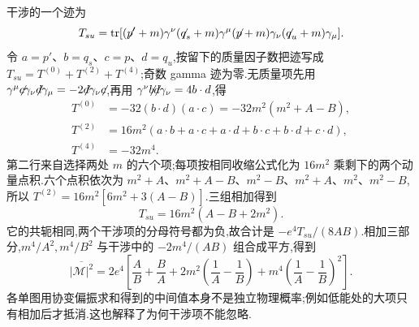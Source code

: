 干涉的一个迹为
\begin{equation}
 T_{su}=\tr[(\slashed p'+m)\gamma^\nu(\slashed q_s+m)\gamma^\mu
 (\slashed p+m)\gamma_\nu(\slashed q_u+m)\gamma_\mu].
\end{equation}
令 $a=p'$、$b=q_s$、$c=p$、$d=q_u$,按留下的质量因子数把迹写成 $T_{su}=T^{(0)}+T^{(2)}+T^{(4)}$;奇数 gamma 迹为零.无质量项先用
$\gamma^\mu\slashed c\gamma_\nu\slashed d\gamma_\mu=-2\slashed d\gamma_\nu\slashed c$,再用 $\gamma^\nu\slashed b\slashed d\gamma_\nu=4b\cdot d$,得
\begin{align}
 T^{(0)}&=-32(b\cdot d)(a\cdot c)=-32m^2(m^2+A-B),\\
 T^{(2)}&=16m^2(a\cdot b+a\cdot c+a\cdot d+b\cdot c+b\cdot d+c\cdot d),\\
 T^{(4)}&=-32m^4.
\end{align}
第二行来自选择两处 $m$ 的六个项;每项按相同收缩公式化为 $16m^2$ 乘剩下的两个动量点积.六个点积依次为 $m^2+A$、$m^2+A-B$、$m^2-B$、$m^2+A$、$m^2$、$m^2-B$,所以 $T^{(2)}=16m^2[6m^2+3(A-B)]$.三组相加得到
\begin{equation}
 T_{su}=16m^2(A-B+2m^2).
\end{equation}
它的共轭相同,两个干涉项的分母符号都为负,故合计是 $-e^4T_{su}/(8AB)$.相加三部分,$m^4/A^2,m^4/B^2$ 与干涉中的 $-2m^4/(AB)$ 组合成平方,得到
\begin{equation}
 \overline{|\mathcal M|^2}=2e^4\left[
 \frac AB+\frac BA+2m^2\left(\frac1A-\frac1B\right)
 +m^4\left(\frac1A-\frac1B\right)^2\right].
 \label{eq:compton-invariant-square}
\end{equation}
各单图用协变偏振求和得到的中间值本身不是独立物理概率;例如低能处的大项只有相加后才抵消.这也解释了为何干涉项不能忽略.


